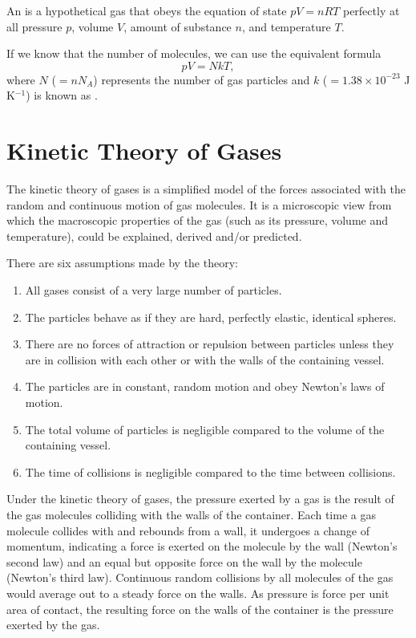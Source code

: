 \begin{definition}
    An  is a hypothetical gas that obeys the equation of state $pV = nRT$ perfectly at all pressure $p$, volume $V$, amount of substance $n$, and temperature $T$.
\end{definition}

If we know that the number of molecules, we can use the equivalent formula \[pV = NkT,\] where $N$ ($= n N_A$) represents the number of gas particles and $k$ ($= 1.38 \times 10^{-23}$ J K$^{-1}$) is known as .

\section{Kinetic Theory of Gases}

The kinetic theory of gases is a simplified model of the forces associated with the random and continuous motion of gas molecules. It is a microscopic view from which the macroscopic properties of the gas (such as its pressure, volume and temperature), could be explained, derived and/or predicted.

There are six assumptions made by the theory:
\begin{enumerate}
    \item All gases consist of a very large number of particles.
    \item The particles behave as if they are hard, perfectly elastic, identical spheres.
    \item There are no forces of attraction or repulsion between particles unless they are in collision with each other or with the walls of the containing vessel.
    \item The particles are in constant, random motion and obey Newton's laws of motion.
    \item The total volume of particles is negligible compared to the volume of the containing vessel.
    \item The time of collisions is negligible compared to the time between collisions.
\end{enumerate}

Under the kinetic theory of gases, the pressure exerted by a gas is the result of the gas molecules colliding with the walls of the container. Each time a gas molecule collides with and rebounds from a wall, it undergoes a change of momentum, indicating a force is exerted on the molecule by the wall (Newton's second law) and an equal but opposite force on the wall by the molecule (Newton's third law). Continuous random collisions by all molecules of the gas would average out to a steady force on the walls. As pressure is force per unit area of contact, the resulting force on the walls of the container is the pressure exerted by the gas.


